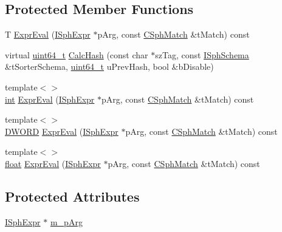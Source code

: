 \subsection*{Protected Member Functions}
\begin{DoxyCompactItemize}
\item 
T \hyperlink{classExpr__ArgVsSet__c_ae6307501846df33f018e6bd58e91b38f}{Expr\-Eval} (\hyperlink{structISphExpr}{I\-Sph\-Expr} $\ast$p\-Arg, const \hyperlink{classCSphMatch}{C\-Sph\-Match} \&t\-Match) const 
\item 
virtual \hyperlink{sphinxstd_8h_aaa5d1cd013383c889537491c3cfd9aad}{uint64\-\_\-t} \hyperlink{classExpr__ArgVsSet__c_a250bcadbda86a16d302455e1f540f2ac}{Calc\-Hash} (const char $\ast$sz\-Tag, const \hyperlink{classISphSchema}{I\-Sph\-Schema} \&t\-Sorter\-Schema, \hyperlink{sphinxstd_8h_aaa5d1cd013383c889537491c3cfd9aad}{uint64\-\_\-t} u\-Prev\-Hash, bool \&b\-Disable)
\item 
{\footnotesize template$<$$>$ }\\\hyperlink{sphinxexpr_8cpp_a4a26e8f9cb8b736e0c4cbf4d16de985e}{int} \hyperlink{classExpr__ArgVsSet__c_a36542eccaf29b125950cd384b6e800e7}{Expr\-Eval} (\hyperlink{structISphExpr}{I\-Sph\-Expr} $\ast$p\-Arg, const \hyperlink{classCSphMatch}{C\-Sph\-Match} \&t\-Match) const
\item 
{\footnotesize template$<$$>$ }\\\hyperlink{sphinxstd_8h_a798af1e30bc65f319c1a246cecf59e39}{D\-W\-O\-R\-D} \hyperlink{classExpr__ArgVsSet__c_a7651a6f77b72cb68a8b895e765c9d32b}{Expr\-Eval} (\hyperlink{structISphExpr}{I\-Sph\-Expr} $\ast$p\-Arg, const \hyperlink{classCSphMatch}{C\-Sph\-Match} \&t\-Match) const
\item 
{\footnotesize template$<$$>$ }\\\hyperlink{sphinxexpr_8cpp_a0e0d0739f7035f18f949c2db2c6759ec}{float} \hyperlink{classExpr__ArgVsSet__c_a0c0e0d4c7bfd148f05e79d27ab24b691}{Expr\-Eval} (\hyperlink{structISphExpr}{I\-Sph\-Expr} $\ast$p\-Arg, const \hyperlink{classCSphMatch}{C\-Sph\-Match} \&t\-Match) const
\end{DoxyCompactItemize}
\subsection*{Protected Attributes}
\begin{DoxyCompactItemize}
\item 
\hyperlink{structISphExpr}{I\-Sph\-Expr} $\ast$ \hyperlink{classExpr__ArgVsSet__c_a09cf690a8c6ce85b07b3654081714cd0}{m\-\_\-p\-Arg}
\end{DoxyCompactItemize}


